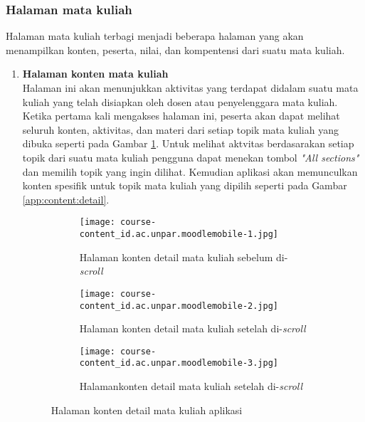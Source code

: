 \subsubsection{Halaman mata kuliah}

Halaman mata kuliah terbagi menjadi beberapa halaman yang akan menampilkan konten, peserta, nilai, dan kompentensi dari suatu mata kuliah. 
\begin{enumerate}
\item  \textbf{Halaman konten mata kuliah} \\
Halaman ini akan menunjukkan aktivitas yang terdapat didalam suatu mata kuliah yang telah disiapkan oleh dosen atau penyelenggara mata kuliah. Ketika pertama kali mengakses halaman ini, peserta akan dapat melihat seluruh konten, aktivitas, dan materi dari setiap topik mata kuliah yang dibuka seperti pada Gambar \ref{app:content}. Untuk melihat aktvitas berdasarakan setiap topik dari suatu mata kuliah pengguna dapat menekan tombol \textit{"All sections"} dan memilih topik yang ingin dilihat. Kemudian aplikasi akan memunculkan konten spesifik untuk topik mata kuliah yang dipilih seperti pada Gambar \ref{app:content:detail}.

\begin{figure}[H] 
	\centering 
	\begin{subfigure}[ht]{.3\textwidth}
	\centering
	\texttt{[image: course-content\_id.ac.unpar.moodlemobile-1.jpg]}  
	\caption{Halaman konten detail mata kuliah sebelum di-\textit{scroll}}
	\end{subfigure}
	\hfill
	\begin{subfigure}[ht]{.3\textwidth}
	\centering
	\texttt{[image: course-content\_id.ac.unpar.moodlemobile-2.jpg]}  
	\caption{Halaman konten detail mata kuliah setelah di-\textit{scroll}}
	\end{subfigure}
	\hfill
	\begin{subfigure}[ht]{.3\textwidth}
	\centering
	\texttt{[image: course-content\_id.ac.unpar.moodlemobile-3.jpg]}  
	\caption{Halamankonten detail mata kuliah setelah di-\textit{scroll}}
	\end{subfigure} 
	\caption[Halaman konten detail mata kuliah aplikasi] {Halaman konten detail mata kuliah aplikasi} 
	\label{app:content} 
\end{figure}  


\end{enumerate}
